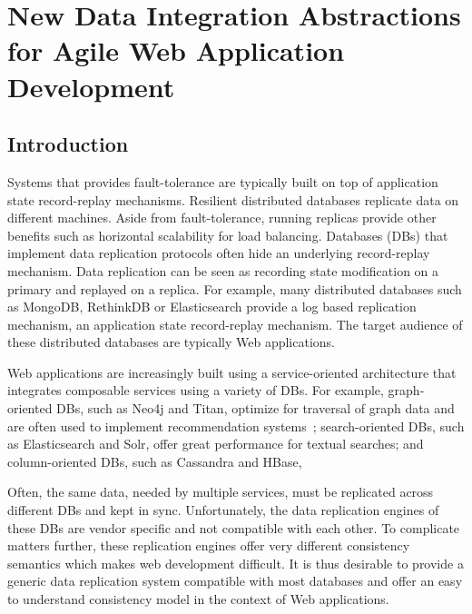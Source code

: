 \chapter{New Data Integration Abstractions for Agile Web Application Development}
\label{ch:synapse}

\section{Introduction}
\label{sec:intro}

Systems that provides fault-tolerance are typically built on top of
application state record-replay mechanisms. Resilient distributed databases replicate data on
different machines. Aside from fault-tolerance, running replicas provide other
benefits such as horizontal scalability for load balancing. Databases (DBs) that
implement data replication protocols often hide an underlying record-replay
mechanism. Data replication can be seen as recording state modification on a
primary and replayed on a replica. For example, many distributed databases such
as MongoDB, RethinkDB or Elasticsearch provide a log based replication mechanism,
an application state record-replay mechanism.  The target audience of these
distributed databases are typically Web applications.

Web applications are increasingly built using a service-oriented
architecture that integrates composable services using a variety of DBs.
For example, graph-oriented DBs, such as Neo4j and Titan, optimize for
traversal of graph data and are often used to implement recommendation
systems~\cite{db-revolution}; search-oriented DBs, such as
Elasticsearch and Solr, offer great performance for textual searches; and
column-oriented DBs, such as Cassandra and HBase,

Often, the same data, needed by multiple services, must be replicated across
different DBs and kept in sync. Unfortunately, the data replication engines of
these DBs are vendor specific and not compatible with each other. To complicate
matters further, these replication engines offer very different consistency
semantics which makes web development difficult.
It is thus desirable to provide a generic data replication system compatible
with most databases and offer an easy to understand consistency model in the
context of Web applications.


